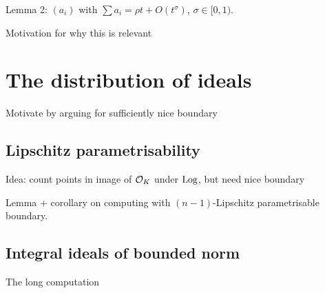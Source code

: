 \documentclass[11pt]{report}
\begin{document}
Lemma 2: $(a_i)$ with $\sum a_i = \rho t + O(t^\sigma)$, $\sigma \in [0, 1)$.

Motivation for why this is relevant
\section{The distribution of ideals}
Motivate by arguing for sufficiently nice boundary
\subsection{Lipschitz parametrisability}
Idea: count points in image of $\mathcal{O}_K$ under $\operatorname{Log}$, but need nice boundary

Lemma + corollary on computing with $(n - 1)$-Lipschitz parametrisable boundary.

\subsection{Integral ideals of bounded norm}
The long computation
\end{document}
